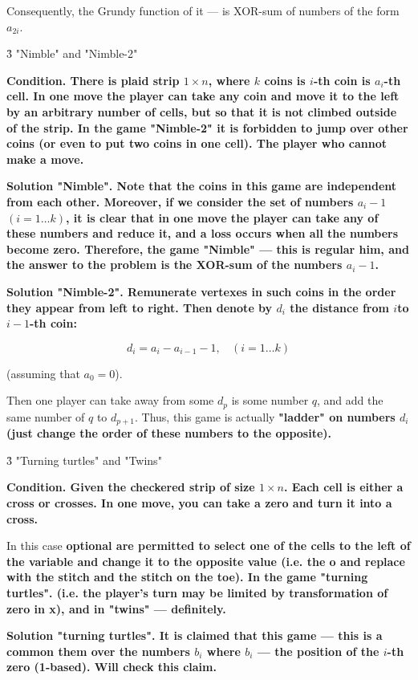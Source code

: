 Consequently, the Grundy function of it --- is XOR-sum of numbers of the form $a_{2i}$.


\h3{ "Nimble" and "Nimble-2" }

\bf{Condition}. There is plaid strip $1 \times n$, where $k$ coins is $i$-th coin is $a_i$-th cell. In one move the player can take any coin and move it to the left by an arbitrary number of cells, but so that it is not climbed outside of the strip. In the game "Nimble-2" it is forbidden to jump over other coins (or even to put two coins in one cell). The player who cannot make a move.

\bf{Solution "Nimble"}. Note that the coins in this game are independent from each other. Moreover, if we consider the set of numbers $a_i-1$ $(i = 1 \ldots k)$, it is clear that in one move the player can take any of these numbers and reduce it, and a loss occurs when all the numbers become zero. Therefore, the game "Nimble" --- this is \bf{regular him}, and the answer to the problem is the XOR-sum of the numbers $a_i-1$.

\bf{Solution "Nimble-2"}. Remunerate vertexes in such coins in the order they appear from left to right. Then denote by $d_i$ the distance from $i$to $i-1$-th coin:

$$ d_i = a_i - a_{i-1} - 1, ~~~~ (i = 1 \ldots k) $$

(assuming that $a_0 = 0$).

Then one player can take away from some $d_p$ is some number $q$, and add the same number of $q$ to $d_{p+1}$. Thus, this game is actually \bf{"ladder"} on numbers $d_i$ (just change the order of these numbers to the opposite).


\h3{ "Turning turtles" and "Twins" }

\bf{Condition}. Given the checkered strip of size $1 \times n$. Each cell is either a cross or crosses. In one move, you can take a zero and turn it into a cross.

In this case \bf{optional} are permitted to select one of the cells to the left of the variable and change it to the opposite value (i.e. the o and replace with the stitch and the stitch on the toe). In the game "turning turtles". (i.e. the player's turn may be limited by transformation of zero in x), and in "twins" --- definitely.

\bf{Solution "turning turtles"}. It is claimed that this game --- this is a common them over the numbers $b_i$ where $b_i$ --- the position of the $i$-th zero (1-based). Will check this claim.

